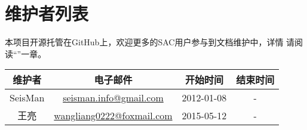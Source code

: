 {\section*{维护者列表}}

本项目开源托管在GitHub上，欢迎更多的SAC用户参与到文档维护中，详情
请阅读``''一章。
\begin{table}[H]
\centering
\begin{tabular}{cccc}
\toprule
维护者      & 电子邮件              &   开始时间    &   结束时间     \\
\midrule
SeisMan  & \url{seisman.info@gmail.com}    &  2012-01-08   &   -     \\
王亮     & \url{wangliang0222@foxmail.com} &  2015-05-12   &   -     \\
\bottomrule
\end{tabular}
\end{table}
